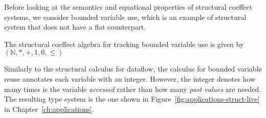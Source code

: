 Before looking at the semantics and equational properties of structural coeffect systems,
we consider bounded variable use, which is an example of structural system that does not
have a flat counterpart.

\begin{example}
The structural coeffect algebra for tracking bounded variable use is given by
$(\mathbb{N}, \ast, +, 1, 0, \leq)$
\end{example}

\noindent
Similarly to the structural calculus for dataflow, the calculus for bounded variable reuse
annotates each variable with an integer. However, the integer denotes how many times is the variable
\emph{accessed} rather than how many \emph{past values} are needed. The resulting type system is
the one shown in Figure~\ref{fig:applications-struct-live} in Chapter~\ref{ch:applications}.



%
%


